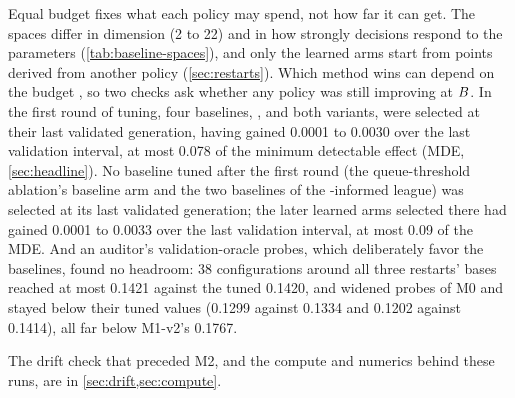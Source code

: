 Equal budget fixes what each policy may spend, not how far it can get. The spaces differ in
dimension (2 to 22) and in how strongly decisions respond to the parameters
(\cref{tab:baseline-spaces}), and only the learned arms start from points derived from another
policy (\cref{sec:restarts}). Which method wins can depend on the budget \citep{dodge2019show}, so
two checks ask whether any policy was still improving at $B$. In the first round of tuning,
four baselines, ,  and both 
variants, were selected at their last validated generation, having gained 0.0001 to 0.0030 over the
last validation interval, at most 0.078 of the minimum detectable effect (MDE,
\cref{sec:headline}).
No baseline tuned after the first round (the queue-threshold ablation's baseline arm and the two
baselines of the \ais{}-informed league) was selected at its last validated generation; the later
learned arms selected there had gained 0.0001 to 0.0033 over the last validation interval, at most
0.09 of the MDE. And an
auditor's validation-oracle probes, which deliberately favor the baselines, found no headroom: 38
 configurations around all three restarts' bases reached at most 0.1421 against the
tuned 0.1420, and widened probes of M0 and  stayed below their tuned
values (0.1299 against 0.1334 and 0.1202 against 0.1414), all far below M1-v2's 0.1767.

The drift check that preceded M2, and the compute and numerics behind these runs, are in
\cref{sec:drift,sec:compute}.
